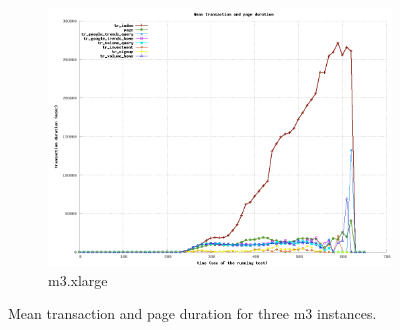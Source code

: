 \documentclass[dvips,12pt]{article}
\begin{document}
\begin{figure}[h!]
\begin{subfigure}[b]{0.3\textwidth}
        \includegraphics[width=\textwidth]{images/transaction_xlarge.png}
        \caption{m3.xlarge}
    \end{subfigure}
    \caption{Mean transaction and page duration for three m3 instances.}
\end{figure}
\end{document}
